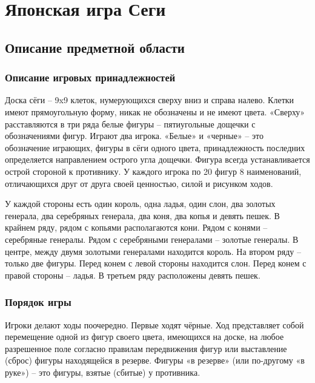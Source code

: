 





\tableofcontents
\newpage



\section{Японская игра Сеги}

\subsection{Описание предметной области}

\subsubsection{Описание игровых принадлежностей}

Доска сёги – 9x9 клеток, нумерующихся сверху вниз и справа налево. Клетки имеют прямоугольную форму, никак не обозначены и не имеют цвета. «Сверху» расставляются в три ряда белые фигуры – пятиугольные дощечки с обозначениями фигур. Играют два игрока. «Белые» и «черные» – это обозначение играющих, фигуры в сёги одного цвета, принадлежность последних определяется направлением острого угла дощечки. Фигура всегда устанавливается острой стороной к противнику. У каждого игрока по 20 фигур 8 наименований, отличающихся друг от друга своей ценностью, силой и рисунком ходов.

У каждой стороны есть один король, одна ладья, один слон, два золотых генерала, два серебряных генерала, два коня, два копья и девять пешек. В крайнем ряду, рядом с копьями располагаются кони. Рядом с конями – серебряные генералы. Рядом с серебряными генералами – золотые генералы. В центре, между двумя золотыми генералами находится король. На втором ряду – только две фигуры. Перед конем с левой стороны находится слон. Перед конем с правой стороны – ладья. В третьем ряду расположены девять пешек.

\subsubsection{Порядок игры}

Игроки делают ходы поочередно. Первые ходят чёрные. Ход представляет собой перемещение одной из фигур своего цвета, имеющихся на доске, на любое разрешенное поле согласно правилам передвижения фигур или выставление (сброс) фигуры находящейся в резерве. Фигуры «в резерве» (или по-другому «в руке») – это фигуры, взятые (сбитые) у противника.

